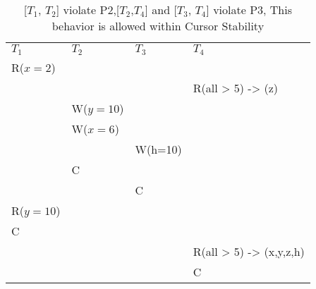 \begin{table}[h]
    \begin{tabular}{l|l|l|l}
        $T_1$            & $T_2$            & $T_3$   & $T_4$   \\
    R($x = 2$)  &           &        &  \\
                &           &        & R(all > 5) -> (z)     \\
                & W($y = 10$)&        &  \\
                & W($x = 6$)&        &      \\
                &           & W(h=10)&     \\
                & C         &        &      \\
                &           & C      &      \\
    R($y = 10$)  &           &        &      \\
    C           &           &        &      \\
                &           &        & R(all > 5) -> (x,y,z,h)     \\
                &           &        & C    
    \end{tabular}
    \caption{[$T_1$, $T_2$] violate P2,[$T_2$,$T_4$] and [$T_3$, $T_4$] violate P3, This behavior is allowed within Cursor Stability}
\end{table}